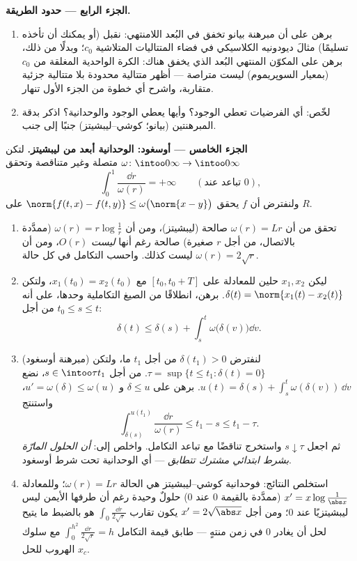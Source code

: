 \begin{problem}[{مسألة نهاية الأسبوع --- وجود حلول المعادلة
$x' = f(t, x)$ دون شرط ليبشيتز}]
\medskip
\noindent\textbf{الجزء الرابع --- حدود الطريقة.}
\begin{enumerate}[resume]
  \item برهن على أن مبرهنة بيانو تخفق في البُعد اللامنتهي:
        نقبل (أو يمكنك أن تأخذه تسليمًا) مثالَ ديودونيه
        الكلاسيكي في فضاء المتتاليات المتلاشية $c_0$؛ وبدلًا من
        ذلك، برهن على المكوّن المنتهي البُعد الذي يخفق هناك:
        الكرة الواحدية المغلقة من $c_0$ (بمعيار السوپريموم) ليست
        متراصة --- أظهر متتالية محدودة بلا متتالية جزئية
        متقاربة، واشرح أي خطوة من الجزء الأول تنهار.
  \item لخّص: أي الفرضيات تعطي الوجود؟ وأيها يعطي الوجود
        والوحدانية؟ اذكر بدقة المبرهنتين (بيانو؛
        كوشي--ليبشيتز) جنبًا إلى جنب.
\end{enumerate}

\medskip
\noindent\textbf{الجزء الخامس --- أوسغود: الوحدانية أبعد من
ليبشيتز.} لتكن $\omega\colon\intoo0\infty\to\intoo0\infty$ متصلة وغير متناقصة وتحقق
\[
\int_0^1\frac{\dd r}{\omega(r)} = +\infty
\qquad(\text{تباعد عند } 0),
\]
ولنفترض أن $f$ يحقق $\norm{f(t, x) - f(t, y)} \leq
\omega\bigl(\norm{x - y}\bigr)$ على $R$.
\begin{enumerate}[resume]
  \item تحقق من أن $\omega(r) = Lr$ صالحة (ليبشيتز)، ومن أن
        $\omega(r) = r\log\frac1r$ (ممدَّدة بالاتصال، من أجل $r$ صغيرة) صالحة رغم
        أنها \emph{ليست} $O(r)$، ومن أن $\omega(r) = 2\sqrt r$ ليست كذلك. واحسب
        التكامل في كل حالة.
  \item ليكن $x_1, x_2$ حلين للمعادلة على $[t_0, t_0 + T]$ مع
        $x_1(t_0) = x_2(t_0)$، ولتكن $\delta(t) =
        \norm{x_1(t) - x_2(t)}$. برهن، انطلاقًا من الصيغ
        التكاملية وحدها، على أنه من أجل $t_0 \leq s \leq t$:
        \[
        \delta(t) \leq \delta(s) +
        \int_s^t\omega\bigl(\delta(v)\bigr)\dd v .
        \]
  \item (مبرهنة أوسغود) لنفترض $\delta(t_1) > 0$ من أجل $t_1$ ما، ولتكن
        $\tau = \sup\{t \leq t_1 : \delta(t) =
        0\}$. من أجل $s \in \intoo\tau{t_1}$، نضع $u(t) = \delta(s)
        + \int_s^t\omega(\delta(v))\,\dd v$. برهن على $\delta \leq
        u$
        و $u' = \omega(\delta) \leq \omega(u)$، واستنتج
        \[
        \int_{\delta(s)}^{u(t_1)}\frac{\dd r}{\omega(r)}
        \leq t_1 - s \leq t_1 - \tau .
        \]
        ثم اجعل $s \downarrow \tau$ واستخرج تناقضًا مع تباعد التكامل. واخلص
        إلى: \emph{أن الحلول المارّة بشرط ابتدائي مشترك
        تتطابق} --- أي الوحدانية تحت شرط أوسغود.
  \item استخلص النتائج: فوحدانية كوشي--ليبشيتز هي الحالة
        $\omega(r) = Lr$؛ وللمعادلة $x' =
        x\log\frac1{\abs x}$ (ممدَّدة بالقيمة $0$
        عند $0$) حلولٌ وحيدة رغم أن طرفها الأيمن ليس ليبشيتزيًا
        عند $0$؛ ومن أجل $x' = 2\sqrt{\abs x}$ يكون تقارب $\int_0\frac{\dd r}{2\sqrt r}$ هو بالضبط
        ما يتيح لحل أن يغادر $0$ في زمن منتهٍ --- طابق قيمة
        التكامل $\int_0^{h^2}\frac{\dd r}{2\sqrt r} = h$ مع سلوك الهروب للحل $x_c$.
\end{enumerate}


\end{problem}
